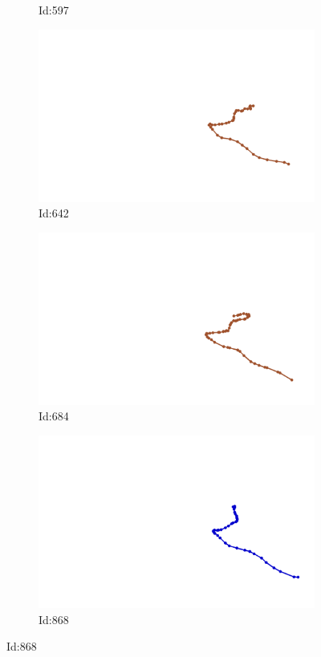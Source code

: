 \documentclass[12pt,twoside]{report}
\begin{document}
\begin{figure}
\begin{subfigure}[b]{0.20\textwidth}
\caption{Id:597}
\end{subfigure}
\begin{subfigure}[b]{0.20\textwidth}
\centering
\includegraphics[width=\textwidth]{../../trajectories/642.png}
\caption{Id:642}
\end{subfigure}
\begin{subfigure}[b]{0.20\textwidth}
\centering
\includegraphics[width=\textwidth]{../../trajectories/684.png}
\caption{Id:684}
\end{subfigure}
\begin{subfigure}[b]{0.20\textwidth}
\centering
\includegraphics[width=\textwidth]{../../trajectories/868.png}
\caption{Id:868}
\end{subfigure}
\end{figure}
\end{document}
